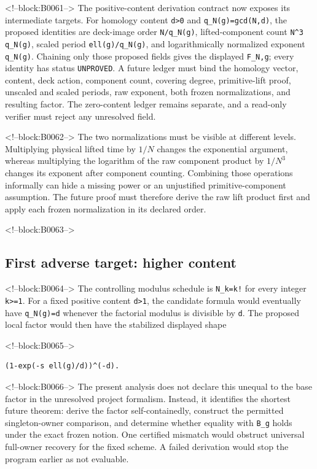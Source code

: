 \documentclass[11pt]{article}
\begin{document}
<!--block:B0061-->
The positive-content derivation contract now exposes its intermediate
targets. For homology content \texttt{d>0} and
\texttt{q\_N(g)=gcd(N,d)}, the proposed identities are deck-image order
\texttt{N/q\_N(g)}, lifted-component count \texttt{N^3 q\_N(g)}, scaled
period \texttt{ell(g)/q\_N(g)}, and logarithmically normalized exponent
\texttt{q\_N(g)}. Chaining only those proposed fields gives the displayed
\texttt{F\_N,g}; every identity has status \texttt{UNPROVED}. A future ledger
must bind the homology vector, content, deck action, component count, covering
degree, primitive-lift proof, unscaled and scaled periods, raw exponent, both
frozen normalizations, and resulting factor. The zero-content ledger remains
separate, and a read-only verifier must reject any unresolved field.

<!--block:B0062-->
The two normalizations must be visible at different levels. Multiplying
physical lifted time by $1/N$ changes the exponential argument, whereas
multiplying the logarithm of the raw component product by $1/N^3$
changes its exponent after component counting. Combining those
operations informally can hide a missing power or an unjustified
primitive-component assumption. The future proof must therefore derive
the raw lift product first and apply each frozen normalization in its
declared order.

<!--block:B0063-->
\hypertarget{42-first-adverse-target-higher-content}{%
\subsection{First adverse target: higher
content}\label{42-first-adverse-target-higher-content}}

<!--block:B0064-->
The controlling modulus schedule is \texttt{N\_k=k!} for every integer
\texttt{k\textgreater{}=1}. For a fixed positive content
\texttt{d\textgreater{}1}, the candidate formula would eventually have
\texttt{q\_N(g)=d} whenever the factorial modulus is divisible by
\texttt{d}. The proposed local factor would then have the stabilized
displayed shape

<!--block:B0065-->
\begin{verbatim}
(1-exp(-s ell(g)/d))^(-d).
\end{verbatim}

<!--block:B0066-->
The present analysis does not declare this unequal to the base factor in the
unresolved project formalism. Instead, it identifies the shortest future
theorem: derive the factor self-containedly, construct the permitted
singleton-owner comparison, and determine whether equality with
\texttt{B\_g} holds under the exact frozen notion. One certified
mismatch would obstruct universal full-owner recovery for the fixed
scheme. A failed derivation would stop the program earlier as not
evaluable.
\end{document}
